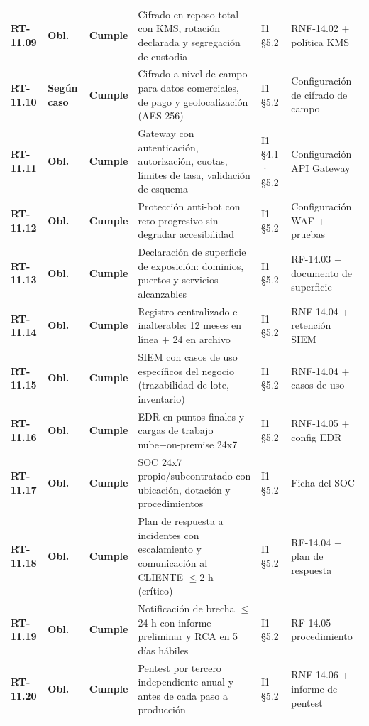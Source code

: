 \begin{small}
\begin{longtable}{@{}p{1.35cm} p{1.15cm} p{1.15cm} p{4.6cm} p{2.35cm} p{3.8cm}@{}}
\textbf{RT-11.09} & \textbf{Obl.} & \textbf{Cumple} & Cifrado en reposo total con KMS, rotaci\'on declarada y segregaci\'on de custodia & I1 §5.2 & RNF-14.02 + pol\'itica KMS \\
\textbf{RT-11.10} & \textbf{Según caso} & \textbf{Cumple} & Cifrado a nivel de campo para datos comerciales, de pago y geolocalizaci\'on (AES-256) & I1 §5.2 & Configuraci\'on de cifrado de campo \\
\textbf{RT-11.11} & \textbf{Obl.} & \textbf{Cumple} & Gateway con autenticaci\'on, autorizaci\'on, cuotas, l\'imites de tasa, validaci\'on de esquema & I1 §4.1 · §5.2 & Configuraci\'on API Gateway \\
\textbf{RT-11.12} & \textbf{Obl.} & \textbf{Cumple} & Protecci\'on anti-bot con reto progresivo sin degradar accesibilidad & I1 §5.2 & Configuraci\'on WAF + pruebas \\
\textbf{RT-11.13} & \textbf{Obl.} & \textbf{Cumple} & Declaraci\'on de superficie de exposici\'on: dominios, puertos y servicios alcanzables & I1 §5.2 & RF-14.03 + documento de superficie \\
\textbf{RT-11.14} & \textbf{Obl.} & \textbf{Cumple} & Registro centralizado e inalterable: 12 meses en l\'inea + 24 en archivo & I1 §5.2 & RNF-14.04 + retenci\'on SIEM \\
\textbf{RT-11.15} & \textbf{Obl.} & \textbf{Cumple} & SIEM con casos de uso espec\'ificos del negocio (trazabilidad de lote, inventario) & I1 §5.2 & RNF-14.04 + casos de uso \\
\textbf{RT-11.16} & \textbf{Obl.} & \textbf{Cumple} & EDR en puntos finales y cargas de trabajo nube+on-premise 24x7 & I1 §5.2 & RNF-14.05 + config EDR \\
\textbf{RT-11.17} & \textbf{Obl.} & \textbf{Cumple} & SOC 24x7 propio/subcontratado con ubicaci\'on, dotaci\'on y procedimientos & I1 §5.2 & Ficha del SOC \\
\textbf{RT-11.18} & \textbf{Obl.} & \textbf{Cumple} & Plan de respuesta a incidentes con escalamiento y comunicaci\'on al CLIENTE $\leq$2 h (cr\'itico) & I1 §5.2 & RF-14.04 + plan de respuesta \\
\textbf{RT-11.19} & \textbf{Obl.} & \textbf{Cumple} & Notificaci\'on de brecha $\leq$24 h con informe preliminar y RCA en 5 d\'ias h\'abiles & I1 §5.2 & RF-14.05 + procedimiento \\
\textbf{RT-11.20} & \textbf{Obl.} & \textbf{Cumple} & Pentest por tercero independiente anual y antes de cada paso a producci\'on & I1 §5.2 & RNF-14.06 + informe de pentest \\

\end{longtable}
\end{small}
